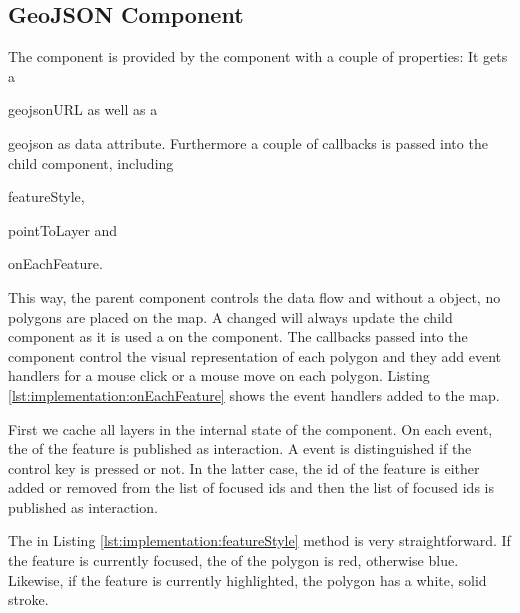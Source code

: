 \subsection{GeoJSON Component}

The  component is provided by the  component with a couple of properties:
It gets a
\begin{enumerate*}[label=(\arabic*)]
  \item
    geojsonURL as well as a
  \item
    geojson as data attribute. Furthermore a couple of callbacks is passed into the child component, including
  \item
    featureStyle,
  \item
    pointToLayer and
  \item
    onEachFeature.
\end{enumerate*}

This way, the parent  component controls the data flow and without a  object, no polygons are placed on the map.
A changed  will always update the child component as it is used a  on the  component.
The callbacks passed into the  component control the visual representation of each polygon and they add event handlers for a mouse click or a mouse move on each polygon.
Listing \ref{lst:implementation:onEachFeature} shows the event handlers added to the map.



First we cache all layers in the internal state of the  component.
On each  event, the  of the feature is published as  interaction.
A  event is distinguished if the control key is pressed or not.
In the latter case, the id of the feature is either added or removed from the list of focused ids and then the list of focused ids is published as  interaction.



The  in Listing \ref{lst:implementation:featureStyle} method is very straightforward.
If the feature is currently focused, the  of the polygon is red, otherwise blue.
Likewise, if the feature is currently highlighted, the polygon has a white, solid stroke.

